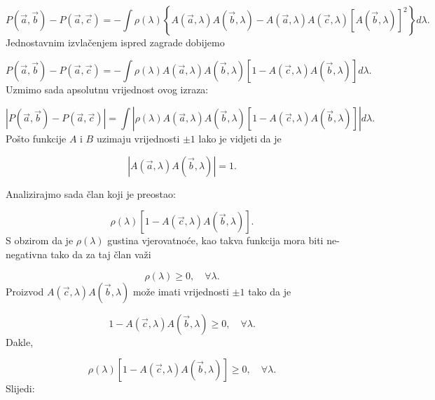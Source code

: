 \begin{equation}
    P(\vec{a}, \vec{b}) - P(\vec{a}, \vec{c})  = - \int \rho (\lambda) \left\{A(\vec{a}, \lambda) A(\vec{b}, \lambda) - A(\vec{a}, \lambda) A(\vec{c}, \lambda)[A(\vec{b}, \lambda)]^2 \right\}d\lambda.
\end{equation}
Jednostavnim izvlačenjem ispred zagrade dobijemo

\begin{equation}
    P(\vec{a}, \vec{b}) - P(\vec{a}, \vec{c})  = - \int \rho (\lambda) A(\vec{a}, \lambda) A(\vec{b}, \lambda) [1- A(\vec{c}, \lambda) A(\vec{b}, \lambda) ] d\lambda.
\end{equation}
Uzmimo sada apsolutnu vrijednost ovog izraza:

\begin{equation}
    \left|{P(\vec{a}, \vec{b}) - P(\vec{a}, \vec{c})}\right| =  \int \left| \rho (\lambda) A(\vec{a}, \lambda) A(\vec{b}, \lambda) [1- A(\vec{c}, \lambda) A(\vec{b}, \lambda)  ] \right| d\lambda.
\end{equation}
Pošto funkcije $A$ i $B$ uzimaju vrijednosti $\pm 1$ lako je vidjeti da je

\begin{equation}
    \left|A(\vec{a}, \lambda) A(\vec{b}, \lambda)\right| = 1.
\end{equation}

Analizirajmo sada član koji je preostao:

\begin{equation}
    \rho (\lambda)[1 - A(\vec{c}, \lambda) A(\vec{b}, \lambda) ].
\end{equation}
S obzirom da je $\rho(\lambda)$ gustina vjerovatnoće, kao takva funkcija mora biti ne-negativna tako da za taj član važi

\begin{equation}
    \rho(\lambda) \ge0 , \quad \forall \lambda.
\end{equation}
Proizvod $A(\vec{c}, \lambda) A(\vec{b}, \lambda)$ može imati vrijednosti $\pm 1$ tako da je

\begin{equation}
    1 - A(\vec{c}, \lambda) A(\vec{b}, \lambda) \ge 0 , \quad \forall \lambda.
\end{equation}
Dakle,

\begin{equation}
    \rho (\lambda)[1 - A(\vec{c}, \lambda) A(\vec{b}, \lambda) ] \ge 0, \quad \forall \lambda.
\end{equation}
Slijedi:


